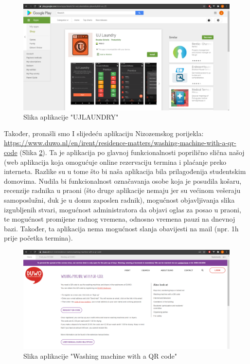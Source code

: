 			\begin{figure}[H]
				\includegraphics[width=.9\linewidth]{slike/UJLAUNDRY.PNG}
				\caption{Slika aplikacije "UJLAUNDRY"}
				\label{fig:ujlaundry}
			\end{figure}
		
			{Također, pronašli smo I slijedeću aplikaciju Nizozemskog porijekla: \url{https://www.duwo.nl/en/irent/residence-matters/washing-machine-with-a-qr-code} (Slika  \ref{fig:duwo}). Ta je aplikacija po glavnoj funkcionalnosti 
			poprilično slična našoj (web aplikacija koja omogućuje online rezervaciju termina i plaćanje preko
			interneta. Razlike su u tome što bi naša aplikacija bila prilagođenija studentskim domovima. Nudila bi
			funkcionalnost označavanja osobe koja je posudila košaru, recenzije radnika u praoni (što druge
			aplikacije nemaju jer su većinom vešeraju samoposlužni, duk je u domu zaposlen radnik), mogućnost
			objavljivanja slika izgubljenih stvari, mogućnost administratora da objavi oglas za posao u praoni, te
			mogućnost promijene radnog vremena, odnosno vremena pauzi na dnevnoj bazi. Također, ta aplikacija
			nema mogućnost slanja obavijesti na mail (npr. 1h prije početka termina).}
		
			\begin{figure}[H]
				\includegraphics[width=.9\linewidth]{slike/DUWO.PNG}
				\caption{Slika aplikacije "Washing machine with a QR code"}
				\label{fig:duwo}
			\end{figure}
		
